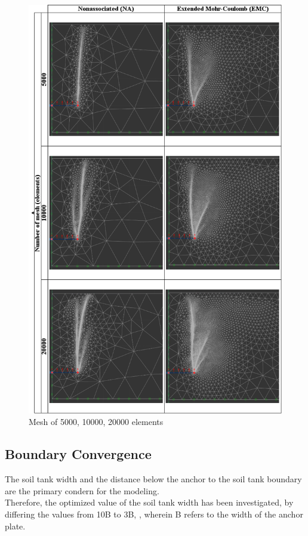 \documentclass[a4paper, nobind]{templates/ociamthesis}
\begin{document}
\begin{figure}[H]
\includegraphics[width=1\linewidth]{myfigureeeeee/3} \caption{Mesh of 5000, 10000, 20000 elements}\label{fig:unnamed-chunk-18}
\end{figure}

\hypertarget{boundary-convergence}{%
\subsection{Boundary Convergence}\label{boundary-convergence}}

The soil tank width and the distance below the anchor to the soil tank boundary are the primary condern for the modeling.\\
Therefore, the optimized value of the soil tank width has been investigated, by differing the values from 10B to 3B, , wherein B refers to the width of the anchor plate.
\end{document}
